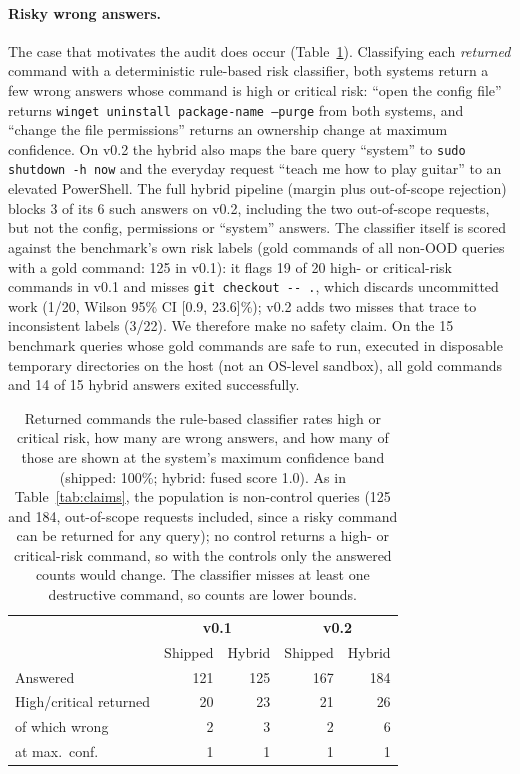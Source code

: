 \paragraph{Risky wrong answers.} The case that motivates the audit does occur (Table~\ref{tab:risk}). Classifying each
\emph{returned} command with a deterministic rule-based risk classifier, both systems return a few wrong answers whose
command is high or critical risk: ``open the config file'' returns \texttt{winget uninstall package-name --purge}
from both systems, and ``change the file permissions'' returns an ownership change at maximum confidence. On v0.2 the
hybrid also maps the bare query ``system'' to \texttt{sudo shutdown -h now} and the everyday request ``teach me how to
play guitar'' to an elevated PowerShell. The full hybrid pipeline (margin plus out-of-scope rejection) blocks 3 of its
6 such answers on v0.2, including the two out-of-scope requests, but not the config, permissions or ``system'' answers. The classifier itself is scored against the benchmark's own risk labels
(gold commands of all non-OOD queries with a gold command: 125 in v0.1): it flags 19 of 20 high- or critical-risk commands in
v0.1 and misses \texttt{git checkout -{}- .}, which discards uncommitted work (1/20, Wilson 95\% CI [0.9, 23.6]\%); v0.2
adds two misses that trace to inconsistent labels (3/22). We therefore make no safety claim. On the 15 benchmark
queries whose gold commands are safe to run, executed in disposable temporary directories on the host (not an
OS-level sandbox), all gold commands and 14 of 15 hybrid answers exited successfully.

\begin{table}[t]
  \centering
  \small
  \setlength{\tabcolsep}{3pt}
  \begin{tabular}{@{}lrrrr@{}}
    \toprule
    & \multicolumn{2}{c}{\textbf{v0.1}} & \multicolumn{2}{c}{\textbf{v0.2}} \\
    & Shipped & Hybrid & Shipped & Hybrid \\
    \midrule
    Answered                 & 121 & 125 & 167 & 184 \\
    High/critical returned   & 20  & 23  & 21  & 26 \\
    \quad of which wrong     & 2   & 3   & 2   & 6 \\
    \quad \quad at max.\ conf. & 1 & 1 & 1 & 1 \\
    \bottomrule
  \end{tabular}
  \caption{Returned commands the rule-based classifier rates high or critical risk, how many are wrong answers, and how
  many of those are shown at the system's maximum confidence band (shipped: 100\%; hybrid: fused score 1.0). As in
  Table~\ref{tab:claims}, the population is non-control queries (125 and 184, out-of-scope requests included, since a
  risky command can be returned for any query); no control returns a high- or critical-risk command, so with the
  controls only the answered counts would change. The classifier misses at least one
  destructive command, so counts are lower bounds.}
  \label{tab:risk}
\end{table}

